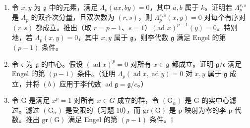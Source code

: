\begin{enumerate}
\def\labelenumi{(\alph{enumi})}
\setcounter{enumi}{1}
\item
  令 \(x, y\) 为 \(\mathfrak{g}\) 中的元素，满足 \(\Lambda_p(ax, by) = 0\)，其中 \(a, b\) 属于 \(k\)。证明若 \(\Lambda_p^{r,s}\) 是 \(\Lambda_p\) 的双齐次分量，且双次数为 \((r, s)\)，则 \(\Lambda_p^{r,s}(x, y) = 0\) 对每个有序对 \((r, s)\) 都成立。推出（取 \(r = p - 1\)、\(s = 1\)）\((\text{ad } x)^{p-1}(y) = 0\)。特别地，若 \(\Lambda_p(x, y) = 0\)，其中 \(x, y\) 属于 \(\mathfrak{g}\)，则李代数 \(\mathfrak{g}\) 满足 Engel 的第 \((p - 1)\) 条件。
\item
  令 \(\mathfrak{c}\) 为 \(\mathfrak{g}\) 的中心。假设 \((\operatorname{ad} x)^p = 0\) 对所有 \(x \in \mathfrak{g}\) 都成立。证明 \(\mathfrak{g} / \mathfrak{c}\) 满足 Engel 的第 \((p - 1)\) 条件。（证明 \(\Lambda_p(\operatorname{ad} x, \operatorname{ad} y) = 0\) 对 \(x, y\) 属于 \(\mathfrak{g}\) 成立，并将 \((b)\) 应用于李代数 \(\operatorname{ad} \mathfrak{g} = \mathfrak{g} / c\)。）
\item
  令 G 是满足 \(x^{p}=1\) 对所有 \(x\in G\) 成立的群，令 \((\mathrm{G}_{\alpha})\) 是 G 的实中心滤过。滤过 \((\mathrm{G}_{\alpha})\) 是受限的（习题 10），而 \(\mathrm{gr}(\mathrm{G})\) 是 p-映射为零的李 p-代数。推出 \(\mathrm{gr}(\mathrm{G})\) 满足 Engel 的第 \((p-1)\) 条件。†
\end{enumerate}


